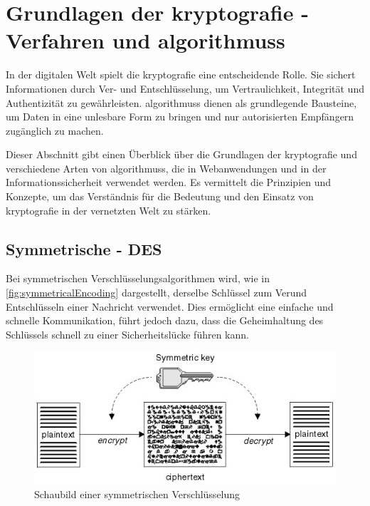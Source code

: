 \newpage


\section[Grundlagen der Kryptografie - Kryptografische Verfahren und Algorithmen]{Grundlagen der \gls{kryptografie} -  Verfahren und \glspl{algorithmus}}\label{sec:grundlagen-der-kryptografie}


In der digitalen Welt spielt die \Gls{kryptografie} eine entscheidende Rolle.
Sie sichert Informationen durch Ver- und Entschlüsselung, um Vertraulichkeit, Integrität und Authentizität zu gewährleisten.
 \glspl{algorithmus} dienen als grundlegende Bausteine, um Daten in eine unlesbare Form zu bringen und nur autorisierten Empfängern zugänglich zu machen.

Dieser Abschnitt gibt einen Überblick über die Grundlagen der \Gls{kryptografie} und verschiedene Arten von \glspl{algorithmus}, die in Webanwendungen und in der Informationssicherheit verwendet werden.
Es vermittelt die Prinzipien und Konzepte, um das Verständnis für die Bedeutung und den Einsatz von \Gls{kryptografie} in der vernetzten Welt zu stärken.


\subsection[Symmetrische Verschlüsselungsalgorithmen]{Symmetrische  - \acf{DES}}\label{subsec:symmetrsiche-algorithmen}
Bei symmetrischen Verschlüsselungsalgorithmen wird, wie in \autoref{fig:symmetricalEncoding}\autocite{Chapter211:online} dargestellt, derselbe Schlüssel zum Ver\nonbreakdash und Entschlüsseln einer Nachricht verwendet.
Dies ermöglicht eine einfache und schnelle Kommunikation, führt jedoch dazu, dass die Geheimhaltung des Schlüssels schnell zu einer Sicherheitslücke führen kann.

\begin{figure}[htbp]
    \includegraphics[width=1\linewidth]{abbildungen/symmetricEncoding}
    \centering
    \caption[
        Schaubild einer symmetrischen Verschlüsselung]{Schaubild einer symmetrischen Verschlüsselung\footnotemark}
    \label{fig:symmetricalEncoding}
\end{figure}\ 


